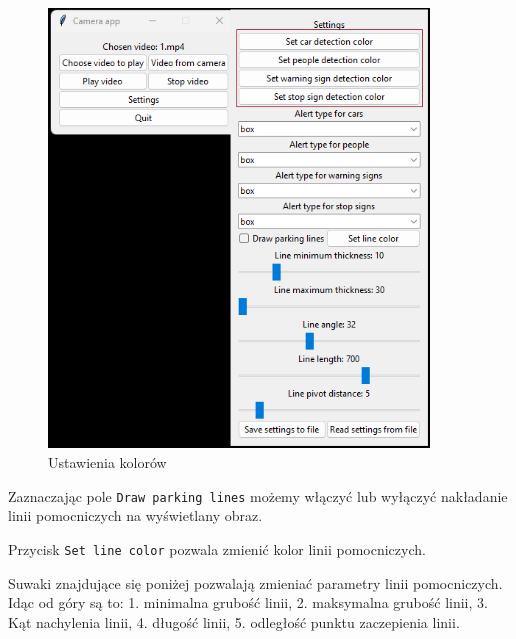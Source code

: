 \begin{figure}[H]
	\centering
	\includegraphics[width=0.9\textwidth]{Img/manual/color_settings.png}
	\caption{Ustawienia kolorów}
	\label{fig:color_settings}
\end{figure}

\newpage

Zaznaczając pole \verb|Draw parking lines| możemy włączyć lub wyłączyć nakładanie linii pomocniczych na wyświetlany obraz.

Przycisk \verb|Set line color| pozwala zmienić kolor linii pomocniczych.

Suwaki znajdujące się poniżej pozwalają zmieniać parametry linii pomocniczych.
Idąc od góry są to: 1. minimalna grubość linii, 2. maksymalna grubość linii, 3. Kąt nachylenia linii, 4. długość linii, 5. odległość punktu zaczepienia linii.

